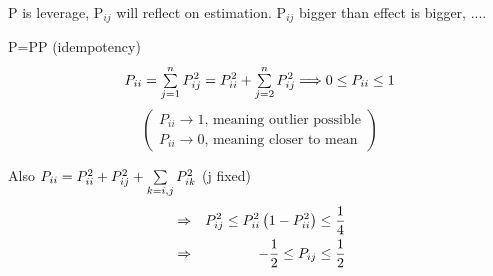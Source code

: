 \documentclass{article}
\begin{document}
P is leverage, P$_{ij}$ will reflect on estimation. P$_{ij}$ bigger than
effect is bigger, ....

\bigskip

P=PP (idempotency)%
\begin{equation*}
P_{ii}=\tsum\limits_{j=1}^{n}P_{ij}^{2}=P_{ii}^{2}+\tsum%
\limits_{j=2}^{n}P_{ij}^{2}\Longrightarrow 0\leq P_{ii}\leq 1
\end{equation*}%
\begin{equation*}
\left( 
\begin{array}{c}
P_{ii}\rightarrow 1\text{, meaning outlier possible} \\ 
P_{ii}\rightarrow 0\text{, meaning closer to mean}%
\end{array}%
\right)
\end{equation*}

\bigskip

Also $P_{ii}=P_{ii}^{2}+P_{ij}^{2}+\mathop{\textstyle \sum }\limits_{k=i,j}P_{ik}^{2}$ (j fixed)%
\begin{eqnarray*}
&\Rightarrow &P_{ij}^{2}\leq P_{ii}^{2}\left( 1-P_{ii}^{2}\right) \leq \frac{%
1}{4} \\
&\Rightarrow &-\frac{1}{2}\leq P_{ij}\leq \frac{1}{2}
\end{eqnarray*}
\end{document}
